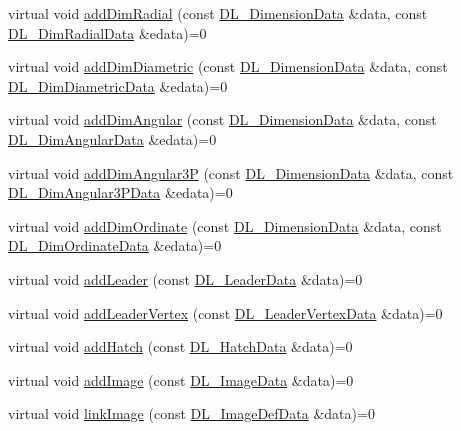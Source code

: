 \begin{DoxyCompactItemize}
virtual void \hyperlink{classDL__CreationInterface_a2fd855b792f7b7ff2ea9d9d009607cd0}{add\-Dim\-Radial} (const \hyperlink{structDL__DimensionData}{D\-L\-\_\-\-Dimension\-Data} \&data, const \hyperlink{structDL__DimRadialData}{D\-L\-\_\-\-Dim\-Radial\-Data} \&edata)=0
\item 
virtual void \hyperlink{classDL__CreationInterface_a9796f030d0158a5451dc08f20631efd9}{add\-Dim\-Diametric} (const \hyperlink{structDL__DimensionData}{D\-L\-\_\-\-Dimension\-Data} \&data, const \hyperlink{structDL__DimDiametricData}{D\-L\-\_\-\-Dim\-Diametric\-Data} \&edata)=0
\item 
virtual void \hyperlink{classDL__CreationInterface_a46f41a545c46040b6a368d415a8a73da}{add\-Dim\-Angular} (const \hyperlink{structDL__DimensionData}{D\-L\-\_\-\-Dimension\-Data} \&data, const \hyperlink{structDL__DimAngularData}{D\-L\-\_\-\-Dim\-Angular\-Data} \&edata)=0
\item 
virtual void \hyperlink{classDL__CreationInterface_a0c3c8c60323edf457d99df5472e1c39b}{add\-Dim\-Angular3\-P} (const \hyperlink{structDL__DimensionData}{D\-L\-\_\-\-Dimension\-Data} \&data, const \hyperlink{structDL__DimAngular3PData}{D\-L\-\_\-\-Dim\-Angular3\-P\-Data} \&edata)=0
\item 
virtual void \hyperlink{classDL__CreationInterface_a72d83659564e2e55fc6d20d6eb11cb00}{add\-Dim\-Ordinate} (const \hyperlink{structDL__DimensionData}{D\-L\-\_\-\-Dimension\-Data} \&data, const \hyperlink{structDL__DimOrdinateData}{D\-L\-\_\-\-Dim\-Ordinate\-Data} \&edata)=0
\item 
virtual void \hyperlink{classDL__CreationInterface_acf6249ec717919ab3afcbeaa726c6271}{add\-Leader} (const \hyperlink{structDL__LeaderData}{D\-L\-\_\-\-Leader\-Data} \&data)=0
\item 
virtual void \hyperlink{classDL__CreationInterface_a76c5860a6488955d1031f64d4f9ba692}{add\-Leader\-Vertex} (const \hyperlink{structDL__LeaderVertexData}{D\-L\-\_\-\-Leader\-Vertex\-Data} \&data)=0
\item 
virtual void \hyperlink{classDL__CreationInterface_ab1020b5a6ed2805304dd0d9ab1ca6125}{add\-Hatch} (const \hyperlink{structDL__HatchData}{D\-L\-\_\-\-Hatch\-Data} \&data)=0
\item 
virtual void \hyperlink{classDL__CreationInterface_a95ba240d97f9d2b450362fa999ad5878}{add\-Image} (const \hyperlink{structDL__ImageData}{D\-L\-\_\-\-Image\-Data} \&data)=0
\item 
virtual void \hyperlink{classDL__CreationInterface_a519f3aba4d7dcd917d800c1aa3eeba49}{link\-Image} (const \hyperlink{structDL__ImageDefData}{D\-L\-\_\-\-Image\-Def\-Data} \&data)=0

\end{DoxyCompactItemize}
